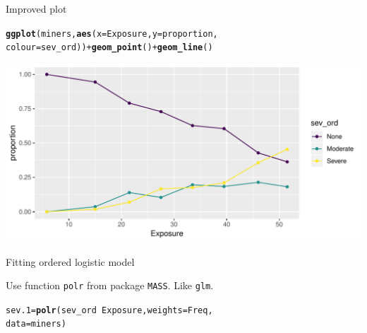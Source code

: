 \documentclass[unknownkeysallowed]{beamer}\usepackage[]{graphicx}\usepackage[]{color}
\makeatletter
\def\maxwidth{ %
  \ifdim\Gin@nat@width>\linewidth
    \linewidth
  \else
    \Gin@nat@width
  \fi
}
\newcommand{\hlopt}[1]{\textcolor[rgb]{0,0,0}{#1}}%
\newcommand{\hlstd}[1]{\textcolor[rgb]{0.345,0.345,0.345}{#1}}%
\newcommand{\hlkwb}[1]{\textcolor[rgb]{0.69,0.353,0.396}{#1}}%
\newcommand{\hlkwc}[1]{\textcolor[rgb]{0.333,0.667,0.333}{#1}}%
\newcommand{\hlkwd}[1]{\textcolor[rgb]{0.737,0.353,0.396}{\textbf{#1}}}%
\newenvironment{kframe}{%
 \def\at@end@of@kframe{}%
 \ifinner\ifhmode%
  \def\at@end@of@kframe{\end{minipage}}%
  \begin{minipage}{\columnwidth}%
 \fi\fi%
 \def\FrameCommand##1{\hskip\@totalleftmargin \hskip-\fboxsep
 \colorbox{shadecolor}{##1}\hskip-\fboxsep
     \hskip-\linewidth \hskip-\@totalleftmargin \hskip\columnwidth}%
 \MakeFramed {\advance\hsize-\width
   \@totalleftmargin\z@ \linewidth\hsize
   \@setminipage}}%
 {\par\unskip\endMakeFramed%
 \at@end@of@kframe}
\newenvironment{knitrout}{}{} %
\makeatother
\begin{document}
\begin{frame}[fragile]{Improved plot}
  
\begin{knitrout}\small
{}\color{fgcolor}\begin{kframe}
\begin{alltt}
\hlkwd{ggplot}\hlstd{(miners,}\hlkwd{aes}\hlstd{(}\hlkwc{x}\hlstd{=Exposure,}\hlkwc{y}\hlstd{=proportion,}
    \hlkwc{colour}\hlstd{=sev_ord))}\hlopt{+}\hlkwd{geom_point}\hlstd{()}\hlopt{+}\hlkwd{geom_line}\hlstd{()}
\end{alltt}
\end{kframe}
\includegraphics[width=\maxwidth]{figure/unnamed-chunk-85-1} 

\end{knitrout}
   
  
\end{frame}


\begin{frame}[fragile]{Fitting ordered logistic model}

Use function \texttt{polr} from package \texttt{MASS}. Like \texttt{glm}.

 
\begin{knitrout}
\color{fgcolor}\begin{kframe}
\begin{alltt}
\hlstd{sev.1}\hlkwb{=}\hlkwd{polr}\hlstd{(sev_ord}\hlopt{~}\hlstd{Exposure,}\hlkwc{weights}\hlstd{=Freq,}
              \hlkwc{data}\hlstd{=miners)}
\end{alltt}
\end{kframe}
\end{knitrout}
  
\end{frame}
\end{document}
